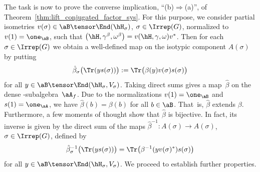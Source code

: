 The task is now to prove the converse implication, ``(b)$\Rightarrow$(a)'', of Theorem~\ref{thm:lift_conjugated_factor_sys}.
For this purpose, we consider partial isometries $v(\sigma) \in \aB \tensor \End(\hH_\sigma)$, $\sigma \in \Irrep(G)$, normalized to $v(1) = \one_\aB$, such that $ \big(\hH, \gamma^\beta, \omega^\beta\big) = v (\hH, \gamma, \omega) v^*$.
Then for each $\sigma \in \Irrep(G)$ we obtain a well-defined map on the isotypic component $A(\sigma)$ by putting
\begin{gather}\label{eq:beta}
	\hat\beta_\sigma \bigl( \Tr (y s(\sigma)) \bigr) := \Tr \bigl( \beta(y) v(\sigma) s(\sigma) \bigr)
\end{gather}
for all $y\in \aB \tensor \End(\hH_\sigma, V_\sigma)$.
Taking direct sums gives a map~$\hat\beta$ on the dense \Star-subalgebra~$\aA_f$.
Due to the normalizations $v(1) = \one_\aB$ and $s(1) = \one_\aA$, we have $\hat \beta(b) = \beta(b)$ for all $b \in \aB$.
That~is, $\hat \beta$ extends $\beta$.
Furthermore, a few moments of thought show that $\hat \beta$ is bijective.
In fact, its inverse is given by the direct sum of the maps $\hat\beta^{-1}\colon A(\sigma) \to A(\sigma)$, $\sigma \in \Irrep(G)$, defined by
\[
\hat\beta^{-1}_\sigma \bigl(\Tr ( y s(\sigma)) \bigr)
	= \Tr \bigl( \beta^{-1} (y v(\sigma)^*) s(\sigma) \bigr)
\] for all $y \in \aB \tensor \End(\hH_\sigma, V_\sigma)$.
We proceed to establish further properties.

